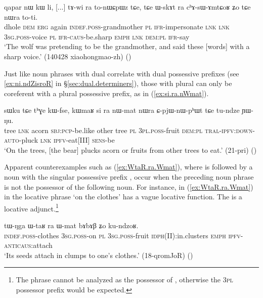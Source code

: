 \begin{exe}
\ex \label{ex:tAwi.ra}
\gll  qapar nɯ kɯ li, [...] tɤ-wi ra to-nɯɕpɯz tɕe, tɕe ɯ-skɤt ra cʰɤ-sɯ-ɤmtɕoʁ ʑo tɕe nɯra to-ti. \\
dhole \textsc{dem} \textsc{erg} again { } \textsc{indef}.\textsc{poss}-grandmother \textsc{pl} \textsc{ifr}-impersonate \textsc{lnk} \textsc{lnk} \textsc{3sg}.\textsc{poss}-voice \textsc{pl} \textsc{ifr}-\textsc{caus}-be.sharp \textsc{emph} \textsc{lnk} \textsc{dem}:\textsc{pl} \textsc{ifr}-say \\
\glt `The wolf was pretending to be the grandmother, and said these [words] with a sharp voice.' (140428 xiaohongmao-zh) ()
\end{exe} 

Just like noun phrases with dual  correlate with dual possessive prefixes (see \ref{ex:ni.ndZisroR} in §\ref{sec:dual.determiners}), those with plural  can only be coreferent with a plural possessive prefix, as  in (\ref{ex:si.ra.nWmat}).

\begin{exe}
\ex \label{ex:si.ra.nWmat}
 \gll  sɯku tɕe tʰɣe kɯ-fse, kɯmaʁ si ra nɯ-mat nɯra ɕ-pjɯ-nɯ-pʰɯt tɕe tu-ndze ɲɯ-ŋu.\\
tree \textsc{lnk} acorn \textsc{sbj}:\textsc{pcp}-be.like other tree \textsc{pl} \textsc{3pl}.\textsc{poss}-fruit \textsc{dem}:\textsc{pl} \textsc{tral}-\textsc{ipfv}:\textsc{down}-\textsc{auto}-pluck \textsc{lnk} \textsc{ipfv}-eat[III] \textsc{sens}-be \\
\glt `On the trees, [the bear] plucks acorn or fruits from other trees to eat.' (21-pri)
()
\end{exe}

Apparent counterexamples such as (\ref{ex:WtaR.ra.Wmat}), where  is followed by a noun with the singular possessive prefix , occur when the preceding noun phrase is not the possessor of the following noun. For instance, in (\ref{ex:WtaR.ra.Wmat})  in the locative phrase  `on the clothes' has a vague locative function. The   is a locative adjunct.\footnote{The phrase   cannot be analyzed as the possessor of , otherwise the \textsc{3pl} possessor prefix  would be expected. }

\begin{exe}
\ex \label{ex:WtaR.ra.Wmat}
 \gll tɯ-ŋga ɯ-taʁ ra ɯ-mat bɤbɤβ ʑo ku-ndzoʁ. \\
 \textsc{indef}.\textsc{poss}-clothes \textsc{3sg}.\textsc{poss}-on \textsc{pl} \textsc{3sg}.\textsc{poss}-fruit \textsc{idph}(II):in.clusters \textsc{emph} \textsc{ipfv}-\textsc{anticaus}:attach \\
\glt `Its seeds attach in clumps to one's clothes.' (18-qromJoR)
()
\end{exe}

